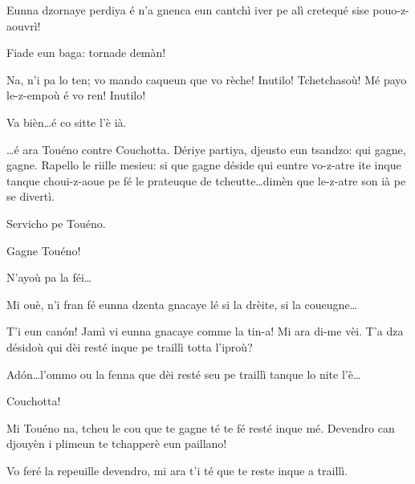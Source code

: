 \begin{drama}
\Genespeaks Eunna dzornaye perdiya é n'a gnenca eun cantchì iver pe alì cretequé sise pouo-z-aouvrì! 

\Sandrinospeaks Fiade eun baga: tornade demàn!

\Genespeaks Na, n'i pa lo ten; vo mando caqueun que vo rèche! Inutilo! Tchetchasoù! Mé payo le-z-empoù é vo ren! Inutilo!


\Sandrinospeaks Va bièn\ldots é co sitte l'è ià.




\Treisouspeaks \ldots é ara Touéno contre Couchotta. Dériye partiya, djeusto eun tsandzo: qui gagne, gagne. Rapello le riille mesieu: si que gagne déside qui euntre vo-z-atre ite inque tanque choui-z-aoue pe fé le prateuque de tcheutte\ldots dimèn que le-z-atre son ià pe se divertì.


\Treisouspeaks Servicho pe Touéno.


\Treisouspeaks Gagne Touéno!

\Treisouspeaks{} N’ayoù pa la féi\ldots

\Tuenospeaks Mi ouè, n'i fran fé eunna dzenta gnacaye lé si la drèite, si la coueugne\ldots

\Treisouspeaks T'i eun can\'on! Jamì vi eunna gnacaye comme la tin-a! Mi ara di-me vèi. T'a dza désidoù qui dèi resté inque pe traillì totta l'iproù?

\Tuenospeaks Ad\'on\ldots l'ommo ou la fenna que dèi resté seu pe traillì tanque lo nite l'è\ldots 


\Tuenospeaks{} Couchotta!

\Gerominespeaks Mi Touéno na, tcheu le cou que te gagne té te fé resté inque mé. Devendro can djouyèn i plimeun te tchapperè eun paillano!

\Treisouspeaks{} Vo feré la repeuille devendro, mi ara t'i té que te reste inque a  traillì.


\end{drama}
